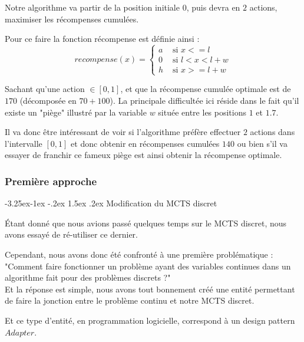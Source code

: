 \documentclass[pdftex,french, english]{article}	%
\makeatletter
\newcounter {subsubsubsection}[subsubsection]
\newcommand\subsubsubsection{\@startsection{subsubsubsection}{4}{\z@}%
                                     {-3.25ex\@plus -1ex \@minus -.2ex}%
                                     {1.5ex \@plus .2ex}%
                                     {\normalfont\normalsize\bfseries}}
\makeatother
\begin{document}
	Notre algorithme va partir de la position initiale $0$, puis devra en $2$ actions, maximiser les récompenses cumulées.

	Pour ce faire la fonction récompense est définie ainsi :
	$$recompense(x) = \left\{
	\begin{array}{ll}
 	a & \mbox{ si $x <= l$}\\
 	0 & \mbox{ si $l < x < l + w$}\\
 	h & \mbox{ si $x >= l + w$}
 	\end{array}\right.$$

	Sachant qu'une action $\in [0, 1]$, et que la récompense cumulée optimale est de $170$ (décomposée en $70 + 100$).
	La principale difficultée ici réside dans le fait qu'il existe un "piège" illustré par la variable $w$ située entre les positions $1$ et $1.7$.

	Il va donc être intéressant de voir si l'algorithme préfère effectuer $2$ actions dans l'intervalle $[0,1]$ et donc obtenir en récompenses cumulées
	$140$ ou bien s'il va essayer de franchir ce fameux piège est ainsi obtenir la récompense optimale.

	\subsubsection{Première approche}
		\subsubsubsection{Modification du MCTS discret}

		Étant donné que nous avions passé quelques temps sur le MCTS discret, nous avons essayé de ré-utiliser ce dernier.

		Cependant, nous avons donc été confronté à une première problématique : "Comment faire fonctionner un problème ayant des variables continues dans un algorithme fait pour des problèmes discrets ?" \\

		Et la réponse est simple, nous avons tout bonnement créé une entité permettant de faire la jonction entre le problème continu et notre MCTS discret. 

		Et ce type d'entité, en programmation logicielle, correspond à un design pattern $Adapter$.\\
\end{document}

